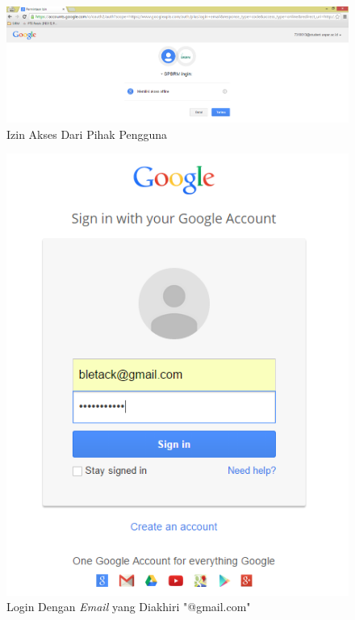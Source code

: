 \begin{figure}[H]
\centering
\includegraphics[scale=0.44]{Gambar/pengujian5.png}
\caption[Izin Akses Dari Pihak Pengguna]{Izin Akses Dari Pihak Pengguna} 
\label{fig:izindaripihakpengguna}
\end{figure}

\begin{figure}[H]
\centering
\includegraphics[scale=0.44]{Gambar/pengujian6.png}
\caption[Login Dengan {\it Email} yang Diakhiri "@gmail.com"]{Login Dengan {\it Email} yang Diakhiri "@gmail.com"}
\label{fig:logindengangmail}
\end{figure}

